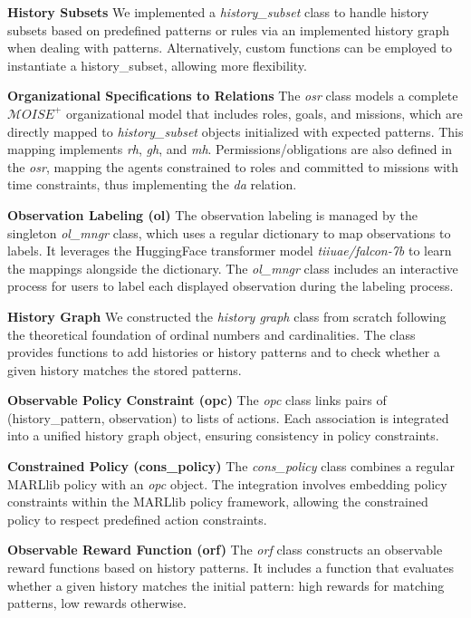\documentclass[runningheads]{llncs}
\theoremstyle{freethm}
\theoremstyle{proofoutline}
\newcounter{relation}
\begin{document}
\textbf{History Subsets} \quad We implemented a \textit{history\_subset} class to handle history subsets based on predefined patterns or rules via an implemented history graph when dealing with patterns. Alternatively, custom functions can be employed to instantiate a history\_subset, allowing more flexibility.

\textbf{Organizational Specifications to Relations} \quad The \textit{osr} class models a complete $\mathcal{M}OISE^+$ organizational model that includes roles, goals, and missions, which are directly mapped to \textit{history\_subset} objects initialized with expected patterns. This mapping implements \textit{rh}, \textit{gh}, and \textit{mh}. Permissions/obligations are also defined in the \textit{osr}, mapping the agents constrained to roles and committed to missions with time constraints, thus implementing the \textit{da} relation.

\textbf{Observation Labeling (ol)} \quad The observation labeling is managed by the singleton \textit{ol\_mngr} class, which uses a regular dictionary to map observations to labels. It leverages the HuggingFace transformer model \textit{tiiuae/falcon-7b} to learn the mappings alongside the dictionary. The \textit{ol\_mngr} class includes an interactive process for users to label each displayed observation during the labeling process. %

\textbf{History Graph} \quad We constructed the \textit{history graph} class from scratch following the theoretical foundation of ordinal numbers and cardinalities. The class provides functions to add histories or history patterns and to check whether a given history matches the stored patterns.

\textbf{Observable Policy Constraint (opc)} \quad The \textit{opc} class links pairs of (history\_pattern, observation) to lists of actions. Each association is integrated into a unified history graph object, ensuring consistency in policy constraints.

\textbf{Constrained Policy (cons\_policy)} \quad The \textit{cons\_policy} class combines a regular MARLlib policy with an \textit{opc} object. The integration involves embedding policy constraints within the MARLlib policy framework, allowing the constrained policy to respect predefined action constraints.

\textbf{Observable Reward Function (orf)} \quad The \textit{orf} class constructs an observable reward functions based on history patterns. It includes a function that evaluates whether a given history matches the initial pattern: high rewards for matching patterns, low rewards otherwise.
\end{document}
